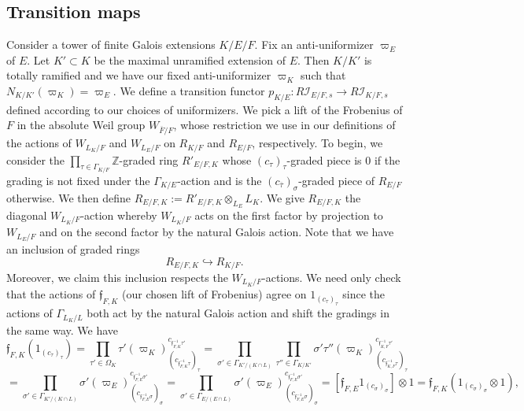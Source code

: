 \documentclass[11pt]{amsart}
\theoremstyle{definition}
\newcommand{\mc}{\mathcal}
\newcommand{\Z}{\mathbb{Z}}
\newcommand{\ov}{\overline}
\newcommand{\mf}{\mathfrak}
\begin{document}
\subsection{Transition maps}
Consider a tower of finite Galois extensions $K/E/F$. Fix an anti-uniformizer $\varpi_E$ of $E$. Let $K' \subset K$ be the maximal unramified extension of $E$. Then $K/K'$ is totally ramified and we have our fixed anti-uniformizer $\varpi_K$ such that $N_{K/K'}(\varpi_K)=\varpi_E$. We define a transition functor $p_{K/E}: R\mc{I}_{E/F, s} \to R\mc{I}_{K/F, s}$ defined according to our choices of uniformizers. We pick a lift of the Frobenius of $F$ in the absolute Weil group $W_{\ov{F}/F}$, whose restriction we use in our definitions of the actions of $W_{L_{K}/F}$ and $W_{L_{E}/F}$ on $R_{K/F}$ and $R_{E/F}$, respectively. To begin, we consider the $\prod\limits_{\tau \in \Gamma_{K/F}} \Z$-graded ring $R'_{E/F, K}$ whose $(c_{\tau})_{\tau}$-graded piece is $0$ if the grading is not fixed under the $\Gamma_{K/E}$-action and is the $(c_{\ov{\tau}})_{\sigma}$-graded piece of $R_{E/F}$ otherwise. We then define $R_{E/F, K} := R'_{E/F, K} \otimes_{L_E} L_K$. We give $R_{E/F, K}$ the diagonal $W_{L_K/F}$-action whereby $W_{L_K/F}$ acts on the first factor by projection to $W_{L_E/F}$ and on the second factor by the natural Galois action. Note that we have an inclusion of graded rings 
\begin{equation*}
    R_{E/F, K} \hookrightarrow R_{K/F}.
\end{equation*}
Moreover, we claim this inclusion respects the $W_{L_K/F}$-actions. We need only check that the actions of $\mf{f}_{F,K}$ (our chosen lift of Frobenius) agree on $1_{(c_{\tau})_{\tau}}$ since the actions of $\Gamma_{L_K/L}$ both act by the natural Galois action and shift the gradings in the same way. We have 
$$
  \mf{f}_{F,K}(1_{(c_{\tau})_{\tau}}) = \prod\limits_{\tau' \in \Omega_{K}} \tau'(\varpi_K)^{c_{\mf{f}_{F,K}^{-1}\tau'}}_{(c_{\mf{f}_{F,K}^{-1}\tau})_{\tau}} = \prod\limits_{\sigma' \in \Gamma_{K'/(K \cap L)}} \prod\limits_{\tau'' \in \Gamma_{K/K'}} \sigma'\tau''(\varpi_K)^{c_{\mf{f}_{K,F}^{-1}\tau'}}_{(c_{\mf{f}_{K,F}^{-1}\tau})_{\tau}}$$
  $$= \prod\limits_{\sigma' \in \Gamma_{K'/(K \cap L)}} \sigma'(\varpi_E)^{c_{\mf{f}_{F,E}^{-1}\sigma'}}_{(c_{\mf{f}_{F,E}^{-1}\sigma})_{\sigma}} = \prod\limits_{\sigma' \in \Gamma_{E/(E \cap L)}} \sigma'(\varpi_E)^{c_{\mf{f}_{F,E}^{-1}\sigma'}}_{(c_{\mf{f}_{F,E}^{-1}\sigma})_{\sigma}} = [\mf{f}_{F,E}1_{(c_{\sigma})_{\sigma}}] \otimes 1 = \mf{f}_{F,K}(1_{(c_{\sigma})_{\sigma}} \otimes 1),$$
\end{document}
